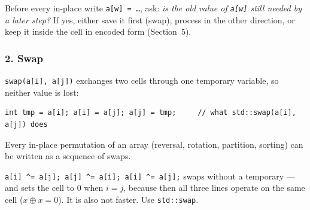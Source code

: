 \begin{diagrambox}
\end{diagrambox}

\begin{insightbox}
Before every in-place write \texttt{a[w] = \ldots}, ask: \emph{is the old value of \texttt{a[w]} still needed by a later step?} If yes, either save it first (swap), process in the other direction, or keep it inside the cell in encoded form (Section~5).
\end{insightbox}

\subsubsection*{2. Swap}

\texttt{swap(a[i], a[j])} exchanges two cells through one temporary variable, so neither value is lost:
\begin{lstlisting}[style=snippet]
int tmp = a[i]; a[i] = a[j]; a[j] = tmp;     // what std::swap(a[i], a[j]) does
\end{lstlisting}
Every in-place permutation of an array (reversal, rotation, partition, sorting) can be written as a sequence of swaps.

\begin{warningbox}
\texttt{a[i] \^{}= a[j]; a[j] \^{}= a[i]; a[i] \^{}= a[j];} swaps without a temporary --- and sets the cell to $0$ when $i = j$, because then all three lines operate on the same cell ($x \oplus x = 0$). It is also not faster. Use \texttt{std::swap}.
\end{warningbox}

